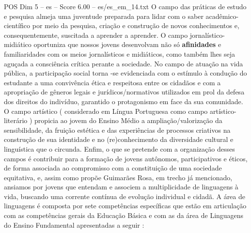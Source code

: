 \begin{textsample}{POS Dim 5 – es – Score 6.00 – es/es\_em\_14.txt}
O campo das práticas de estudo e pesquisa almeja uma juventude preparada para lidar com o saber acadêmico-científico por meio da pesquisa, criação e construção de novos conhecimentos e, consequentemente, suscitada a aprender a aprender.
O campo jornalístico-midiático oportuniza que nossos jovens desenvolvam não só \textbf{afinidades} e familiaridades com os meios jornalísticos e midiáticos, como também lhes seja aguçada a consciência crítica perante a sociedade.
No campo de atuação na vida pública, a participação social torna -se evidenciada com o estímulo à condução do estudante a uma convivência ética e respeitosa entre os cidadãos e com a apropriação de gêneros legais e jurídicos/normativos utilizados em prol da defesa dos direitos do indivíduo, garantido o protagonismo em face da sua comunidade.
O campo artístico ( considerado em Língua Portuguesa como campo artístico-literário ) propicia ao jovem do Ensino Médio a ampliação/valorização da sensibilidade, da fruição estética e das experiências de processos criativos na construção de sua identidade e no (re)conhecimento da diversidade cultural e linguística que o circunda.
Enfim, o que se pretende com a organização desses campos é contribuir para a formação de jovens autônomos, participativos e éticos, de forma associada ao compromisso com a constituição de uma sociedade equitativa, e, assim como propõe Guimarães Rosa, em trecho já mencionado, ansiamos por jovens que entendam e associem a multiplicidade de linguagens à vida, buscando uma corrente contínua de evolução individual e cidadã.
A área de linguagens é composta por sete competências específicas que estão em articulação com as competências gerais da Educação Básica e com as da área de Linguagens do Ensino Fundamental apresentadas a seguir :

\end{textsample}
